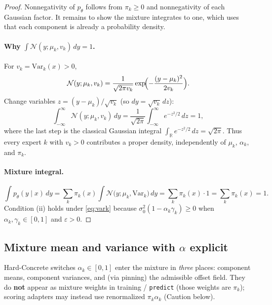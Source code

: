 \documentclass[11pt,a4paper]{article}
\theoremstyle{plain}
\theoremstyle{definition}
\theoremstyle{remark}
\newcommand{\R}{\mathbb{R}}
\newcommand{\Ncal}{\mathcal{N}}
\newcommand{\tht}{\theta}
\begin{document}
\begin{proof}
Nonnegativity of \(p_\tht\) follows from \(\pi_k\ge 0\) and nonnegativity of each
Gaussian factor. It remains to show the mixture integrates to one, which uses
that each component is already a probability density.

\paragraph{Why \(\int\Ncal(y;\mu_k,v_k)\,dy=1\).}
For \(v_k=\mathrm{Var}_k(x)>0\),
\[
  \Ncal(y;\mu_k,v_k)
  =
  \frac{1}{\sqrt{2\pi v_k}}
  \exp\!\Bigl(-\frac{(y-\mu_k)^2}{2v_k}\Bigr).
\]
Change variables \(z=(y-\mu_k)/\sqrt{v_k}\) (so \(dy=\sqrt{v_k}\,dz\)):
\[
  \int_{-\infty}^{\infty}
  \Ncal(y;\mu_k,v_k)\,dy
  =
  \frac{1}{\sqrt{2\pi}}
  \int_{-\infty}^{\infty} e^{-z^2/2}\,dz
  =
  1,
\]
where the last step is the classical Gaussian integral
\(\int_{\R}e^{-z^2/2}\,dz=\sqrt{2\pi}\).
Thus every expert \(k\) with \(v_k>0\) contributes a proper density, independently of
\(\mu_k\), \(\alpha_k\), and \(\pi_k\).

\paragraph{Mixture integral.}
\[
  \int p_\tht(y\mid x)\,dy
  =
  \sum_k\pi_k(x)
  \int \Ncal\!\bigl(y;\mu_k,\mathrm{Var}_k\bigr)\,dy
  =
  \sum_k\pi_k(x)\cdot 1
  =
  \sum_k\pi_k(x)
  =
  1.
\]
Condition (ii) holds under \eqref{eq:vark} because
\(\sigma_0^2(1-\alpha_k\gamma_k)\ge 0\) when \(\alpha_k,\gamma_k\in[0,1]\) and
\(\varepsilon>0\).
\end{proof}

\subsection{Mixture mean and variance with \(\alpha\) explicit}
\label{sec:moments}
Hard-Concrete switches \(\alpha_k\in[0,1]\) enter the mixture in \emph{three} places:
component means, component variances, and (via pinning) the admissible offset field.
They do \textbf{not} appear as mixture weights in training / \texttt{predict}
(those weights are \(\pi_k\)); scoring adapters may instead use renormalized
\(\pi_k\alpha_k\) (Caution below).
\end{document}
